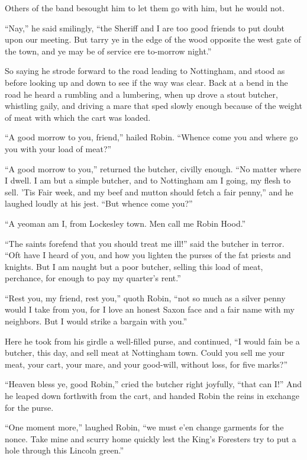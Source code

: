 Others of the band besought him to let them go with him, but he would
not.

``Nay,'' he said smilingly, ``the Sheriff and I are too good friends to
put doubt upon our meeting. But tarry ye in the edge of the wood
opposite the west gate of the town, and ye may be of service ere
to-morrow night.''

So saying he strode forward to the road leading to Nottingham, and stood
as before looking up and down to see if the way was clear. Back at a
bend in the road he heard a rumbling and a lumbering, when up drove a
stout butcher, whistling gaily, and driving a mare that sped slowly
enough because of the weight of meat with which the cart was loaded.

``A good morrow to you, friend,'' hailed Robin. ``Whence come you and
where go you with your load of meat?''

``A good morrow to you,'' returned the butcher, civilly enough. ``No
matter where I dwell. I am but a simple butcher, and to Nottingham am I
going, my flesh to sell. 'Tis Fair week, and my beef and mutton should
fetch a fair penny,'' and he laughed loudly at his jest. ``But whence
come you?''

``A yeoman am I, from Lockesley town. Men call me Robin Hood.''

``The saints forefend that you should treat me ill!'' said the butcher
in terror. ``Oft have I heard of you, and how you lighten the purses of
the fat priests and knights. But I am naught but a poor butcher, selling
this load of meat, perchance, for enough to pay my quarter's rent.''

``Rest you, my friend, rest you,'' quoth Robin, ``not so much as a
silver penny would I take from you, for I love an honest Saxon face and
a fair name with my neighbors. But I would strike a bargain with you.''

Here he took from his girdle a well-filled purse, and continued, ``I
would fain be a butcher, this day, and sell meat at Nottingham town.
Could you sell me your meat, your cart, your mare, and your good-will,
without loss, for five marks?''

``Heaven bless ye, good Robin,'' cried the butcher right joyfully,
``that can I!'' And he leaped down forthwith from the cart, and handed
Robin the reins in exchange for the purse.

``One moment more,'' laughed Robin, ``we must e'en change garments for
the nonce. Take mine and scurry home quickly lest the King's Foresters
try to put a hole through this Lincoln green.''

